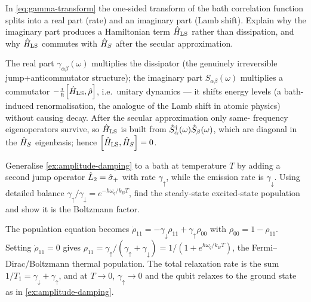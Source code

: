 \begin{exercise}
In \cref{eq:gamma-transform} the one-sided transform of the bath
correlation function splits into a real part (rate) and an
imaginary part (Lamb shift). Explain why the imaginary part
produces a Hamiltonian term $\hat{H}_{\rm LS}$ rather than
dissipation, and why $\hat{H}_{\rm LS}$ commutes with $\hat{H}_S$ after
the secular approximation.
\begin{solution}
The real part $\gamma_{\alpha\beta}(\omega)$ multiplies the
dissipator (the genuinely irreversible jump+anticommutator
structure); the imaginary part $S_{\alpha\beta}(\omega)$ multiplies
a commutator $-\tfrac i\hbar\comm{\op H_{\rm LS}}{\op\rho}$, i.e.\
unitary dynamics --- it shifts energy levels (a bath-induced
renormalisation, the analogue of the Lamb shift in atomic physics)
without causing decay. After the secular approximation only same-
frequency eigenoperators survive, so $\hat{H}_{\rm LS}$ is built from
$\hat{S}_\alpha^\dagger(\omega)\hat{S}_\beta(\omega)$, which are
diagonal in the $\hat{H}_S$ eigenbasis; hence
$\comm{\op H_{\rm LS}}{\op H_S}=0$.
\end{solution}
\end{exercise}

\begin{exercise}
Generalise \cref{ex:amplitude-damping} to a bath at temperature $T$
by adding a second jump operator $\hat{L}_2=\hat\sigma_+$ with rate
$\gamma_\uparrow$, while the emission rate is $\gamma_\downarrow$.
Using detailed balance $\gamma_\uparrow/\gamma_\downarrow
=e^{-\hbar\omega_q/k_BT}$, find the steady-state excited-state
population and show it is the Boltzmann factor.
\begin{solution}
The population equation becomes
$\dot\rho_{11}=-\gamma_\downarrow\rho_{11}+\gamma_\uparrow\rho_{00}$
with $\rho_{00}=1-\rho_{11}$. Setting $\dot\rho_{11}=0$ gives
$\rho_{11}=\gamma_\uparrow/(\gamma_\uparrow+\gamma_\downarrow)
=1/(1+e^{\hbar\omega_q/k_BT})$, the Fermi--Dirac/Boltzmann
thermal population. The total relaxation rate is the sum
$1/T_1=\gamma_\downarrow+\gamma_\uparrow$, and at $T\to0$,
$\gamma_\uparrow\to0$ and the qubit relaxes to the ground state as
in \cref{ex:amplitude-damping}.
\end{solution}
\end{exercise}
